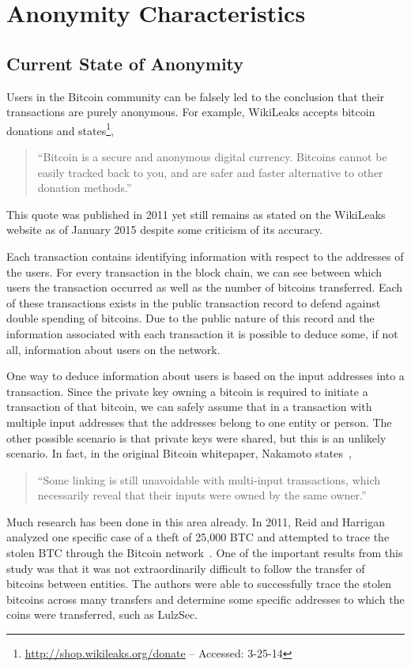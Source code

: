 \documentclass[11pt]{article}
\begin{document}
\section{Anonymity Characteristics} \subsection{Current State of Anonymity} Users in the Bitcoin community can be
falsely led to the conclusion that their transactions are purely anonymous. For example, WikiLeaks accepts bitcoin
donations and states\footnote{\url{http://shop.wikileaks.org/donate} -- Accessed: 3-25-14}, \begin{quote} ``Bitcoin is a
    secure and anonymous digital currency. Bitcoins cannot be easily tracked back to you, and are safer and faster
alternative to other donation methods.'' \end{quote} This quote was published in 2011 yet still remains as stated on the
WikiLeaks website as of January 2015 despite some criticism of its accuracy.

Each transaction contains identifying information with respect to the addresses of the users. For every transaction in
the block chain, we can see between which users the transaction occurred as well as the number of bitcoins transferred.
Each of these transactions exists in the public transaction record to defend against double spending of bitcoins. Due to
the public nature of this record and the information associated with each transaction it is possible to deduce some, if
not all, information about users on the network.

One way to deduce information about users is based on the input addresses into a transaction. Since the private key
owning a bitcoin is required to initiate a transaction of that bitcoin, we can safely assume that in a transaction with
multiple input addresses that the addresses belong to one entity or person. The other possible scenario is that private
keys were shared, but this is an unlikely scenario. In fact, in the original Bitcoin whitepaper, Nakamoto
states~\cite{nakamoto08}, \begin{quote} ``Some linking is still unavoidable with multi-input transactions, which
necessarily reveal that their inputs were owned by the same owner.'' \end{quote}

Much research has been done in this area already. In 2011, Reid and Harrigan analyzed one specific case of a theft of
25,000 BTC and attempted to trace the stolen BTC through the Bitcoin network~\cite{reid11}. One of the important results
from this study was that it was not extraordinarily difficult to follow the transfer of bitcoins between entities. The
authors were able to successfully trace the stolen bitcoins across many transfers and determine some specific addresses
to which the coins were transferred, such as LulzSec.
\end{document}
